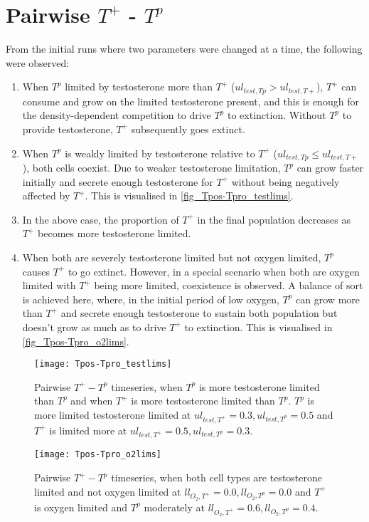 \section{Pairwise $T^+$ - $T^p$}
From the initial runs where two parameters were changed at a time, the following were observed:
\begin{enumerate}
    \item When $T^p$ limited by testosterone more than $T^+$ ($ul_{test,Tp} > ul_{test,T+}$), $T^+$ can consume and grow on the limited testosterone present, and this is enough for the density-dependent competition to drive $T^p$ to extinction. Without $T^p$ to provide testosterone, $T^+$ subsequently goes extinct.
    \item When $T^p$ is weakly limited by testosterone relative to $T^+$ ($ul_{test,Tp} \leq ul_{test,T+}$), both cells coexist. Due to weaker testosterone limitation, $T^p$ can grow faster initially and secrete enough testosterone for $T^+$ without being negatively affected by $T^+$. This is visualised in \autoref{fig_Tpos-Tpro_testlims}.
    \item In the above case, the proportion of $T^+$ in the final population decreases as $T^+$ becomes more testosterone limited.
    \item When both are severely testosterone limited but not oxygen limited, $T^p$ causes $T^+$ to go extinct. However, in a special scenario when both are oxygen limited with $T^+$ being more limited, coexistence is observed. A balance of sort is achieved here, where, in the initial period of low oxygen, $T^p$ can grow more than $T^+$ and secrete enough testosterone to sustain both population but doesn't grow as much as to drive $T^+$ to extinction. This is visualised in \autoref{fig_Tpos-Tpro_o2lims}.
  \end{enumerate}

\begin{figure}[h!]
  \centering
  \texttt{[image: Tpos-Tpro\_testlims]}
  \caption[Pairwise $T^+ - T^p$ timeseries, testosterone limitation]{Pairwise $T^+ - T^p$ timeseries, when $T^p$ is more testosterone limited than $T^p$ and when $T^+$ is more testosterone limited than $T^p$. $T^p$ is more limited testosterone limited at $ul_{test,T^+}=0.3,ul_{test,T^p}=0.5$ and $T^+$ is limited more at $ul_{test,T^+}=0.5,ul_{test,T^p}=0.3$.}
  \label{fig_Tpos-Tpro_testlims}
\end{figure}

\begin{figure}[h!]
  \centering
  \texttt{[image: Tpos-Tpro\_o2lims]}
  \caption[Pairwise $T^+ - T^p$ timeseries, oxygen limitation]{Pairwise $T^+ - T^p$ timeseries, when both cell types are testosterone limited and not oxygen limited at $ll_{O_2,T^+}=0.0, ll_{O_2,T^p}=0.0$ and $T^+$ is oxygen limited and $T^p$ moderately at $ll_{O_2,T^+}=0.6, ll_{O_2,T^p}=0.4$.}
  \label{fig_Tpos-Tpro_o2lims}
\end{figure}


